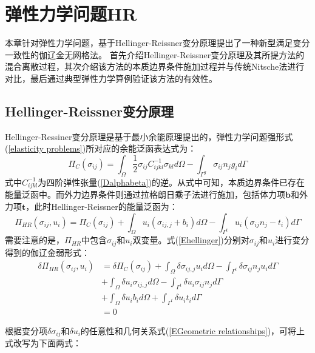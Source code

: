 \chapter{弹性力学问题HR}
本章针对弹性力学问题，基于Hellinger-Reissner变分原理提出了一种新型满足变分一致性的伽辽金无网格法。
首先介绍Hellinger-Reissner变分原理及其所提方法的混合离散过程，其次介绍该方法的本质边界条件施加过程并与传统Nitsche法进行对比，最后通过典型弹性力学算例验证该方法的有效性。
\section{Hellinger-Reissner变分原理}
Hellinger-Ressiner变分原理\cite{}是基于最小余能原理提出的，弹性力学问题强形式(\ref{elasticity problems})所对应的余能泛函表达式为：
\begin{equation}
\Pi_C(\sigma_{ij}) = \int_\Omega \frac{1}{2}\sigma_{ij}C_{ijkl}^{-1}\sigma_{kl} d\Omega - \int_{\Gamma^g} \sigma_{ij} n_j g_i d\Gamma
\end{equation}
式中$C_{ijkl}^{-1}$为四阶弹性张量(\ref{Dalphabeta})的逆。从式中可知，本质边界条件已存在能量泛函中。而外力边界条件则通过拉格朗日乘子法进行施加，包括体力项$\pmb b$和外力项$\pmb t$，此时Hellinger-Reissner的能量泛函为：
\begin{equation}
\label{Ehellinger}
    \Pi_{H\!R}(\sigma_{ij},u_i)=\Pi_C(\sigma_{ij})
    +\int_{\Omega}u_i(\sigma_{ij,j}+b_i)d\Omega-\int_{\Gamma^t}u_i(\sigma_{ij} n_j-t_i)d\Gamma
\end{equation}
需要注意的是，$\Pi_{HR}$中包含$\sigma_{ij}$和$u_i$双变量。式(\ref{Ehellinger})分别对$\sigma_{ij}$和$u_i$进行变分得到的伽辽金弱形式：
\begin{equation}\label{weak form1}
\begin{split} 
    \delta\Pi_{H\!R}(\sigma_{ij},u_i)&=\delta\Pi_C(\sigma_{ij})+\int_{\Omega}\delta\sigma_{ij,j}u_id\Omega-\int_{\Gamma^t}\delta\sigma_{ij}n_ju_id\Gamma\\
    &+\int_{\Omega}\delta u_i\sigma_{ij,j}d\Omega-\int_{\Gamma^t}\delta u_i\sigma_{ij}n_jd\Gamma\\
    &+\int_{\Omega}\delta u_ib_id\Omega+\int_{\Gamma^t}\delta u_it_id\Gamma\\
    &=0
\end{split}
\end{equation}\par
根据变分项$\delta \sigma_{ij}$和$\delta u_i$的任意性和几何关系式(\ref{EGeometric relationships})，可将上式改写为下面两式：
